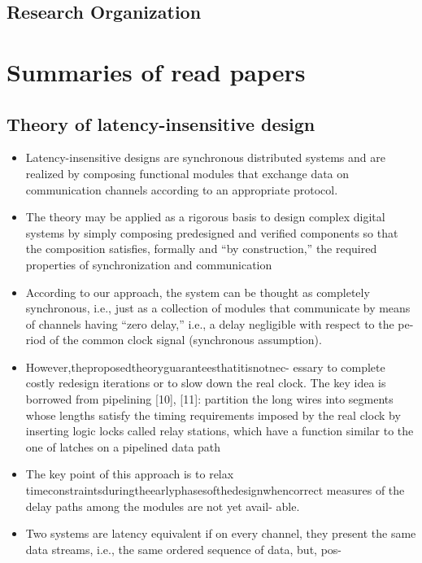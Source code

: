 \documentclass[]{article}
\begin{document}
\subsection{Research Organization}


\section{Summaries of read papers}

\subsection{Theory of latency-insensitive design}
\begin{itemize}
    \item Latency-insensitive designs are synchronous distributed
    systems and are realized by composing functional modules that exchange data 
    on communication channels according to an appropriate protocol.
    \item The
    theory may be applied as a rigorous basis to design complex
    digital systems by simply composing predesigned and verified
    components so that the composition satisfies, formally and “by
    construction,” the required properties of synchronization and
    communication
    \item According to our approach, the
    system can be thought as completely synchronous, i.e., just as a
    collection of modules that communicate by means of channels
    having “zero delay,” i.e., a delay negligible with respect to the pe-
    riod of the common clock signal (synchronous assumption).
    \item However,theproposedtheoryguaranteesthatitisnotnec-
    essary to complete costly redesign iterations or to slow down the
    real clock. The key idea is borrowed from pipelining [10], [11]:
    partition the long wires into segments whose lengths satisfy the
    timing requirements imposed by the real clock by inserting logic
    locks called relay stations, which have a function similar to the
    one of latches on a pipelined data path
    \item The key point of this approach is to relax
    timeconstraintsduringtheearlyphasesofthedesignwhencorrect
    measures of the delay paths among the modules are not yet avail-
    able.
    \item Two systems
    are latency equivalent if on every channel, they present the same
    data streams, i.e., the same ordered sequence of data, but, pos-

\end{itemize}
\end{document}
